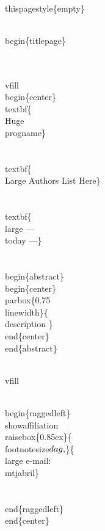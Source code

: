 \documentclass[11pt]{article}
\begin{document}
\nwenddocs{}\endmoddef
\\thispagestyle\{empty\}

\\begin\{titlepage\}

\\ \\vfill
\\begin\{center\}
\\textbf\{\\Huge \\progname\}\\\\[5ex]

\\textbf\{\\Large Authors List Here\}\\\\[5ex] 

\\textbf\{\\large --- \\today ---\}\\\\[10ex]

\\begin\{abstract\}
\\begin\{center\}
\\parbox\{0.75\\linewidth\}\{
\\description
\} %
\\end\{center\}
\\end\{abstract\}

\\vfill

\\begin\{raggedleft\}
\\showaffiliation
\\raisebox\{0.85ex\}\{\\footnotesize$\\dag\\,$\}\{\\large e-mail: \\mtjabril\}\\\\
\\end\{raggedleft\}
\\end\{center\}
\end{document}
